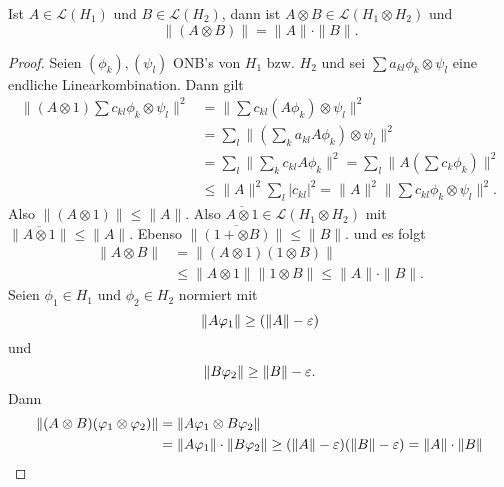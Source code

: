 \documentclass{mycourse}
\begin{document}
\begin{st}
Ist $A\in \mathcal L(H_1)$ und $B\in \mathcal L(H_2)$, dann ist $A\otimes B\in \mathcal L (H_1 \otimes H_2)$ und 
\[
\|(A\otimes B) \| = \| A \| \cdot \| B\|.
\]
\end{st}
\begin{proof}
Seien $(\phi_k), (\psi_l)$ ONB's von $H_1$ bzw. $H_2$ und sei $\sum a_{kl} \phi_k \otimes \psi_l$ eine endliche Linearkombination. Dann gilt
\begin{align*}
\|(A\otimes 1) \sum c_{kl} \phi_k \otimes \psi_l\|^2 &= \|\sum c_{kl} (A\phi_k) \otimes \psi_l\|^2\\
&= \sum_l \| ( \sum_k a_{kl} A \phi_k) \otimes \psi_l\|^2 \\
&= \sum_l \| \sum_k c_{kl} A\phi_k\|^2 = \sum_l \| A(\sum c_k \phi_k)\|^2\\
&\le \|A\|^2 \sum_l |c_{kl}|^2 =\|A\|^2 \| \sum c_{kl} \phi_k \otimes \psi_l\|^2.
\end{align*}
Also $\|(A\otimes 1)\|\le \|A\|$. Also $\overline{A\otimes 1}\in \mathcal L(H_1 \otimes H_2)$ mit $\|\overline{A\otimes 1}\|\le \|A\|$. Ebenso $\| \overline{(1+\otimes B)}\|\le \|B\|$.
und es folgt
\begin{align*}
\| A\otimes B\| &= \|(A\otimes 1) (1\otimes B) \|\\
&\le \|A\otimes 1 \| \|1\otimes B\| \le \|A\| \cdot \|B\|.
\end{align*}
Seien $\phi_1 \in H_1$ und $\phi_2 \in H_2$ normiert mit 
\[
\|A\varphi_1 \| \ge (\|A\|-\varepsilon)
\]
und 
\[
\|B\varphi_2\| \ge \| B\| - \varepsilon.
\]
Dann
\begin{align*}
\|(A\otimes B) (\varphi_1 \otimes \varphi_2) \| &= \| A \varphi_1 \otimes B \varphi_2\|\\
&= \| A\varphi_1\| \cdot \| B \varphi_2\| \ge ( \| A \| - \varepsilon) (\| B\| - \varepsilon) = \| A \| \cdot \|B\| 
\end{align*}
\fixme
\end{proof}
\end{document}
